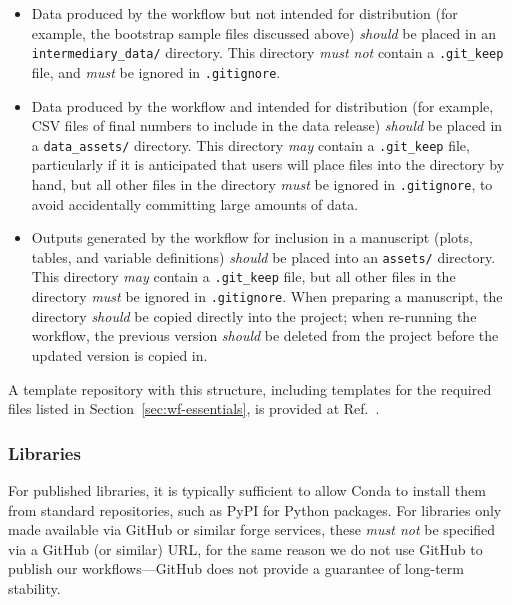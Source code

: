 \documentclass{article}
\newcommand\rfcword[1]{\emph{#1}\xspace}
\newcommand\must{\rfcword{must}}
\newcommand\mustnot{\rfcword{must not}}
\newcommand\should{\rfcword{should}}
\newcommand\may{\rfcword{may}}
\newcommand\filename[1]{\texttt{#1}\xspace}
\begin{document}
\begin{itemize}
  \item
        Data produced by the workflow but not intended for distribution
        (for example,
        the bootstrap sample files discussed above)
        \should be placed in an \filename{intermediary\_data/} directory.
        This directory \mustnot contain a \filename{.git\_keep} file,
        and \must be ignored in \filename{.gitignore}.
  \item
        Data produced by the workflow and intended for distribution
        (for example,
        CSV files of final numbers to include in the data release)
        \should be placed in a \filename{data\_assets/} directory.
        This directory \may contain a \filename{.git\_keep} file,
        particularly if it is anticipated that users will place files into the directory by hand,
        but all other files in the directory \must be ignored in \filename{.gitignore},
        to avoid accidentally committing large amounts of data.
  \item
        Outputs generated by the workflow for inclusion in a manuscript
        (plots, tables, and variable definitions)
        \should be placed into an \filename{assets/} directory.
        This directory \may contain a \filename{.git\_keep} file,
        but all other files in the directory \must be ignored in \filename{.gitignore}.
        When preparing a manuscript,
        the directory \should be copied directly into the project;
        when re-running the workflow,
        the previous version \should be deleted from the project
        before the updated version is copied in.
\end{itemize}

A template repository with this structure,
including templates for the required files listed in Section~\ref{sec:wf-essentials},
is provided at Ref.~\cite{workflow-template}.

\subsubsection{Libraries}

For published libraries,
it is typically sufficient to allow Conda to install them from standard repositories,
such as PyPI for Python packages.
For libraries only made available via GitHub or similar forge services,
these \mustnot be specified via a GitHub
(or similar)
URL,
for the same reason we do not use GitHub to publish our workflows---GitHub
does not provide a guarantee of long-term stability.
\end{document}
